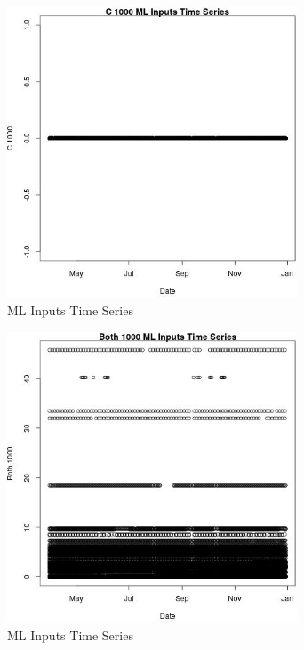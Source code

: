\begin{figure} 
\centering  
\includegraphics[width=0.77\textwidth]{Code_Outputs/Report_ML_input_PM25_Step4_part_e_de_duplicated_aves_C_1000vDate.jpg} 
\caption{\label{fig:Report_ML_input_PM25_Step4_part_e_de_duplicated_avesC_1000vDate}ML Inputs Time Series} 
\end{figure} 
 

\begin{figure} 
\centering  
\includegraphics[width=0.77\textwidth]{Code_Outputs/Report_ML_input_PM25_Step4_part_e_de_duplicated_aves_Both_1000vDate.jpg} 
\caption{\label{fig:Report_ML_input_PM25_Step4_part_e_de_duplicated_avesBoth_1000vDate}ML Inputs Time Series} 
\end{figure} 
 

